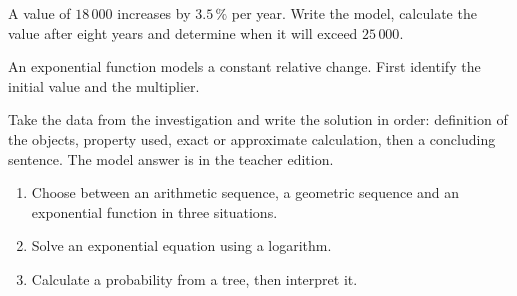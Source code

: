 \begin{activite}
A value of $18\,000$ increases by $3.5\,\%$ per year. Write the model, calculate the value after eight years and determine when it will exceed $25\,000$.
\begin{center}\end{center}
\end{activite}

\begin{traceecrite}An exponential function models a constant relative change. First identify the initial value and the multiplier.\end{traceecrite}

\begin{exemple}
Take the data from the investigation and write the solution in order: definition of the objects, property used, exact or approximate calculation, then a concluding sentence. The model answer is in the teacher edition.
\end{exemple}

\begin{exercice}[-- essentiel]
\begin{enumerate}\item Choose between an arithmetic sequence, a geometric sequence and an exponential function in three situations.\item Solve an exponential equation using a logarithm.\item Calculate a probability from a tree, then interpret it.\end{enumerate}
\end{exercice}


